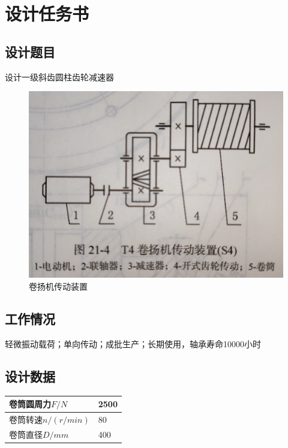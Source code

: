 \section{设计任务书}
\subsection{设计题目}
设计一级斜齿圆柱齿轮减速器\cite{于明礼}
\begin{figure}[h]
    \centering
    \includegraphics[scale=0.1]{graphic/1.jpg}
    \caption{卷扬机传动装置}
\end{figure}
\subsection{工作情况}
轻微振动载荷；单向传动；成批生产；长期使用，轴承寿命10000小时
\subsection{设计数据}
\begin{tabular}{|p{12em}|p{8em}|}
    \hline
    卷筒圆周力$F/N$     & 2500 \\
    \hline
    卷筒转速$n/(r/min)$ & 80   \\
    \hline
    卷筒直径$D/mm$      & 400  \\
    \hline
\end{tabular}